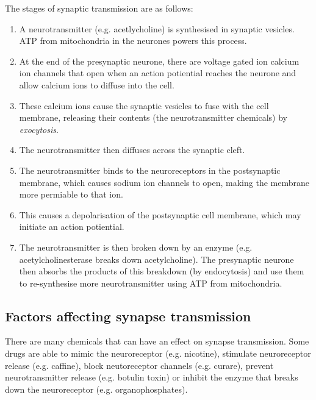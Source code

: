 \documentclass{article}
\begin{document}
The stages of synaptic transmission are as follows:

\begin{enumerate}

	\item A neurotransmitter (e.g. acetlycholine) is synthesised in synaptic
	vesicles. ATP from mitochondria in the neurones powers this process.

	\item At the end of the presynaptic neurone, there are voltage gated ion
	calcium ion channels that open when an action potiential reaches the
	neurone and allow calcium ions to  diffuse into the cell.

	\item These calcium ions cause the synaptic vesicles to fuse with the cell
	membrane, releasing their contents (the neurotransmitter chemicals) by {\it
	exocytosis}.

	\item The neurotransmitter then diffuses across the synaptic cleft.

	\item The neurotransmitter binds to the neuroreceptors in the postsynaptic
	membrane, which causes sodium ion channels to open, making the membrane
	more permiable to that ion.

	\item This causes a depolarisation of the postsynaptic cell membrane, which
	may initiate an action potiential.

	\item The neurotransmitter is then broken down by an enzyme (e.g.
	acetylcholinesterase breaks down acetylcholine). The presynaptic neurone
	then absorbs the products of this breakdown (by endocytosis) and use them
	to re-synthesise more neurotransmitter using ATP from mitochondria.

\end{enumerate}

\subsection*{Factors affecting synapse transmission}

There are many chemicals that can have an effect on synapse transmission. Some
drugs are able to mimic the neuroreceptor (e.g. nicotine), stimulate
neuroreceptor release (e.g. caffine), block neutoreceptor channels (e.g.
curare), prevent neurotransmitter release (e.g. botulin toxin) or inhibit the
enzyme that breaks down the neuroreceptor (e.g. organophosphates).
\end{document}

